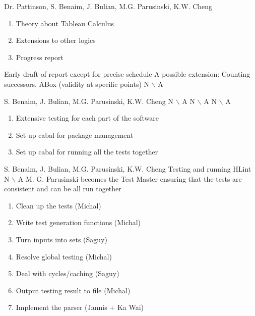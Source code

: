 %
{Dr. Pattinson, S. Benaim, J. Bulian, M.G. Parusinski, K.W. Cheng}%
{\begin{enumerate}
\item Theory about Tableau Calculus
\item Extensions to other logics
\item Progress report
\end{enumerate} }%
{Early draft of report except for precise schedule}
{A possible extension: Counting successors, ABox (validity at specific points)}%
{{N $\backslash$ A}}%

%
{S. Benaim, J. Bulian, M.G. Parusinski, K.W. Cheng}%
{N $\backslash$ A}%
{N $\backslash$ A}%
{N $\backslash$ A}
{\begin{enumerate}
\item Extensive testing for each part of the software
\item Set up cabal for package management
\item Set up cabal for running all the tests together
\end{enumerate}}%

%
{S. Benaim, J. Bulian, M.G. Parusinski, K.W. Cheng}%
{Testing and running HLint}%
{N $\backslash$ A}%
{M. G. Parusinski becomes the Test Master ensuring that the tests are consistent and can be all run together}
{\begin{enumerate}
\item Clean up the tests (Michal) 
\item Write test generation functions (Michal)
\item Turn inputs into sets (Saguy)
\item Resolve global testing (Michal)
\item Deal with cycles/caching (Saguy)
\item Output testing result to file (Michal)
\item Implement the parser (Jannis + Ka Wai)
\end{enumerate}}%

